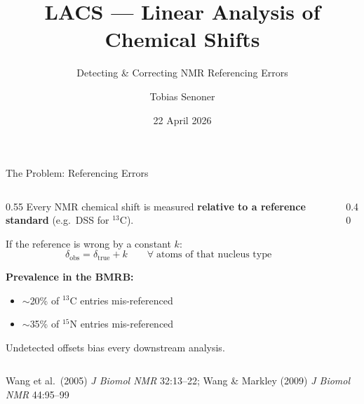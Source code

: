 \documentclass[aspectratio=169,11pt]{beamer}
\title{LACS --- Linear Analysis of Chemical Shifts}
\subtitle{Detecting \& Correcting NMR Referencing Errors}
\date{22 April 2026}
\author{Tobias Senoner}
\institute{TriZOD Project Meeting}
\begin{document}
\maketitle

\begin{frame}{The Problem: Referencing Errors}

\begin{columns}[T]
\begin{column}{0.55\textwidth}
Every NMR chemical shift is measured \textbf{relative to a reference standard}
(e.g.\ DSS for ${}^{13}$C).

\smallskip
If the reference is wrong by a constant $k$:
\[
  \delta_{\text{obs}} = \delta_{\text{true}} + k
  \qquad \forall\;\text{atoms of that nucleus type}
\]

\smallskip
\textbf{Prevalence in the BMRB:}
\begin{itemize}\setlength\itemsep{1pt}
  \item $\sim$20\% of ${}^{13}$C entries mis-referenced
  \item $\sim$35\% of ${}^{15}$N entries mis-referenced
\end{itemize}

\smallskip
\alert{Undetected offsets bias every downstream analysis.}
\end{column}

\begin{column}{0.40\textwidth}
\centering
{}
\end{column}
\end{columns}

\smallskip
\footnotesize
Wang et al.\ (2005) \textit{J Biomol NMR} 32:13--22;\;
Wang \& Markley (2009) \textit{J Biomol NMR} 44:95--99
\end{frame}
\end{document}
